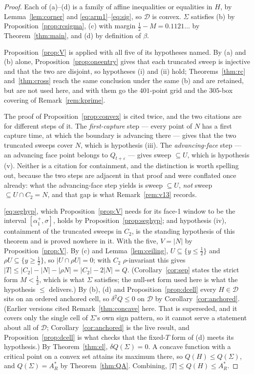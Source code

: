 \documentclass[11pt]{article}
\theoremstyle{definition}
\newcommand{\Sig}{\Sigma}
\begin{document}
\begin{proof}
Each of (a)--(d) is a family of affine inequalities or equalities in $H$, by
Lemma~\ref{lem:corner} and \eqref{eq:arm1}--\eqref{eq:sig}, so $\mathcal D$ is convex.
$\Sig$ satisfies (b) by Proposition~\ref{prop:rcsigma}, (c) with margin
$\tfrac12-M=0.1121\ldots$ by Theorem~\ref{thm:main}, and (d) by definition of $\beta$.

Proposition~\ref{prop:V} is applied with all five of its hypotheses named. By (a) and (b)
alone, Proposition~\ref{prop:oneentry} gives that each truncated sweep is injective and that
the two are disjoint, so hypotheses (i) and (ii) hold; Theorems~\ref{thm:rc}
and~\ref{thm:cross} reach the same conclusion under the same (b) and are retained, but are
not used here, and with them go the $401$-point grid and the $305$-box covering of
Remark~\ref{rem:kprime}.

The proof of Proposition~\ref{prop:convex} is cited twice, and the two citations are for
different steps of it. The \emph{first-capture} step --- every point of $N$ has a first
capture time, at which the boundary is advancing there --- gives that the two truncated
sweeps cover $N$, which is hypothesis (iii). The \emph{advancing-face} step --- an advancing
face point belongs to $Q_{t+\varepsilon}$ --- gives sweep $\subseteq U$, which is hypothesis
(v). Neither is a citation for containment, and the distinction is worth spelling out,
because the two steps are adjacent in that proof and were conflated once already: what the
advancing-face step yields is sweep $\subseteq U$, \emph{not} sweep $\subseteq U\cap C_2=N$,
and that gap is what Remark~\ref{rem:v13} records.

\eqref{eq:seghyp}, which Proposition~\ref{prop:V} needs for its face-1 window to be the
interval $[\alpha_1^+,\sigma]$, holds by Proposition~\ref{prop:seghyp}; and hypothesis (iv),
containment of the truncated sweeps in $C_2$, is the standing hypothesis of this theorem and
is proved nowhere in it. With the five, $V=|N|$ by Proposition~\ref{prop:V}.
By (c) and Lemma~\ref{lem:ceiling},
$U\subseteq\{y\le\tfrac12\}$ and $\rho U\subseteq\{y\ge\tfrac12\}$, so
$|U\cap\rho U|=0$; with $C_2$ $\rho$-invariant this gives
$|T|\le|C_2|-|N|-|\rho N|=|C_2|-2|N|=Q$. (Corollary~\ref{cor:sep} states the strict form
$M<\tfrac12$, which is what $\Sig$ satisfies; the null-set form used here is what the
hypothesis $\le$ delivers.) By (b), (d) and
Proposition~\ref{prop:dcell} every $H\in\mathcal D$ sits on an ordered anchored cell, so
$\delta^2Q\le0$ on $\mathcal D$ by Corollary~\ref{cor:anchored}. (Earlier versions cited
Remark~\ref{thm:concave} here. That is superseded, and it covers only the single cell of
$\Sig$'s own sign pattern, so it cannot serve a statement about all of $\mathcal D$;
Corollary~\ref{cor:anchored} is the live result, and Proposition~\ref{prop:dcell} is what
checks that the fixed-$T$ form of (d) meets its hypothesis.) By Theorem~\ref{thm:el},
$\delta Q(\Sig)=0$. A concave function with a critical point on a convex set attains its
maximum there, so $Q(H)\le Q(\Sig)$, and $Q(\Sig)=A_R^\ast$ by Theorem~\ref{thm:QA}.
Combining, $|T|\le Q(H)\le A_R^\ast$.
\end{proof}
\end{document}
